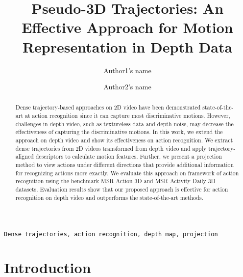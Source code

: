 \documentclass[final,3p,times,twocolumn]{elsarticle}
\begin{document}
\begin{frontmatter}

\title{Pseudo-3D Trajectories: An Effective Approach for Motion Representation in Depth Data}




\author{Author1's name}
\address{Adress 1}

\author{Author2's name}
\address{Adress 2}

\begin{abstract}
Dense trajectory-based approaches on 2D video have been demonstrated state-of-the-art at action recognition since it can capture most discriminative motions.
However, challenges in depth video, such as textureless data and depth noise, may decrease the effectiveness of capturing the discriminative motions.
In this work, we extend the approach on depth video and show its effectiveness on action recognition.
We extract dense trajectories from 2D videos transformed from depth video and apply trajectory-aligned descriptors to calculate motion features.
Further, we present a projection method to view actions under different directions that provide additional information for recognizing actions more exactly.
We evaluate this approach on framework of action recognition using the benchmark MSR Action 3D and MSR Activity Daily 3D datasets.
Evaluation results show that our proposed approach is effective for action recognition on depth video and outperforms the state-of-the-art methods.
\end{abstract}

\begin{keyword}
\texttt{Dense trajectories, action recognition, depth map, projection}
\end{keyword}

\end{frontmatter}

\linenumbers

\section{Introduction}
\end{document}
